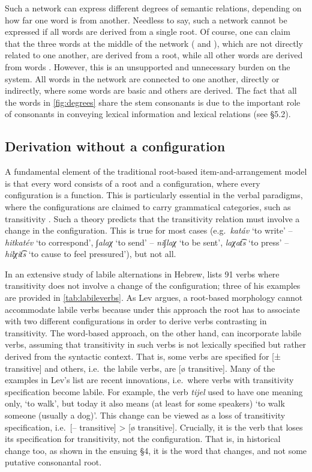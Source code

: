 \documentclass[output=paper,
modfonts
]{LSP/langsci}
\begin{document}
Such a network can express different degrees of semantic relations,
depending on how far one word is from another. Needless to say, such a
network cannot be expressed if all words are derived from a single root.
Of course, one can claim that the three words at the middle of the network (  and ),
which are not directly related to one another, are derived from a root,
while all other words are derived from words \citep{McCarthy1979a, arad2005a}.
However, this is an unsupported and unnecessary burden on the system.
All words in the network are connected to one another, directly or
indirectly, where some words are basic and others are derived. The fact
that all the words in \cref{fig:degrees} share the stem consonants is due to the
important role of consonants in conveying lexical information and
lexical relations (see §5.2).

\subsection{Derivation without a configuration} 

A fundamental element of the traditional root-based item-and-arrangement
model is that every word consists of a root and a configuration, where
every configuration is a function. This is particularly essential in the
verbal paradigms, where the configurations are claimed to carry
grammatical categories, such as transitivity \citep{doron2003a, arad2005a}.
Such a theory predicts that the transitivity relation must involve a change
in the configuration. This is true for most cases (e.g.\ \emph{katáv} `to
write' -- \emph{hitkatév} `to correspond', \emph{∫alaχ} `to send' --
\emph{ni∫laχ} `to be sent', \emph{laχat͡s} `to press' -- \emph{hilχit͡s}
`to cause to feel pressured'), but not all.

In an extensive study of labile alternations in Hebrew, \citet[114--115]{lev2016} lists
91 verbs where transitivity does not involve a change of the
configuration; three of his examples are provided in \cref{tab:labileverbs}.
As Lev argues, a root-based morphology cannot accommodate labile verbs
because under this approach the root has to associate with two different
configurations in order to derive verbs contrasting in transitivity. The
word-based approach, on the other hand, can incorporate labile verbs,
assuming that transitivity in such verbs is not lexically specified but
rather derived from the syntactic context. That is, some verbs are
specified for {[}± transitive{]} and others, i.e.\ the labile verbs, are
{[}ø transitive{]}. Many of the examples in Lev's list are recent
innovations, i.e.\ where verbs with transitivity specification become
labile. For example, the verb \emph{tijel} used to have one meaning
only, `to walk', but today it also means (at least for some speakers)
`to walk someone (usually a dog)'. This change can be viewed as a loss
of transitivity specification, i.e.\ {[}-- transitive{]} \textgreater
{[}ø transitive{]}. Crucially, it is the verb that loses its
specification for transitivity, not the configuration. That is, in
historical change too, as shown in the ensuing §4, it is the word that
changes, and not some putative consonantal root.
\end{document}
